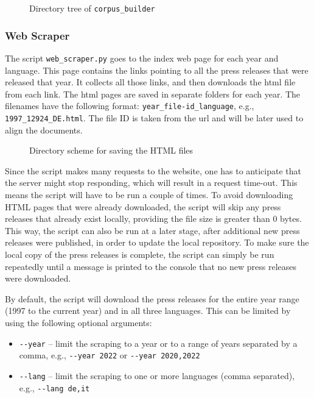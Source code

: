 \begin{figure}

\caption{Directory tree of \texttt{corpus\_builder}}
\end{figure} 
\subsubsection{Web Scraper}
\label{subsubsec:web-scraper}
The script \texttt{web\_scraper.py} goes to the index web page for each year and language. 
This page contains the links pointing to all the press releases that were released that year. 
It collects all those links, and then downloads the \acrshort{html} file from each link. 
The \acrshort{html} pages are saved in separate folders for each year. 
The filenames have the following format: \texttt{year\_file-id\_language}, e.g., \texttt{1997\_12924\_DE.html}. 
The file ID is taken from the \gls{url} and will be later used to align the documents. 


\begin{figure}[ht]
\caption{Directory scheme for saving the HTML files}
\label{fig:html-scheme}
\end{figure} 

Since the script makes many requests to the website, one has to anticipate that the server might stop responding, which will result in a request time-out.  This means the script will have to be run a couple of times.
To avoid downloading HTML pages that were already downloaded, the script will skip any press releases that already exist locally, providing the file size is greater than 0 bytes.
This way, the script can also be run at a later stage, after additional new press releases were published, in order to update the local repository.
To make sure the local copy of the press releases is complete, the script can simply be run repeatedly until a message is printed to the console that no new press releases were downloaded. 

By default, the script will download the press releases for the entire year range (1997 to the current year) and in all three languages. 
This can be limited by using the following optional arguments:
\begin{itemize}
	\item \texttt{-{}-year} -- limit the scraping to a year or to a range of years separated by a comma, e.g., \texttt{-{}-year 2022} or \texttt{-{}-year 2020,2022}
	\item \texttt{-{}-lang} -- limit the scraping to one or more languages (comma separated), e.g., \texttt{-{}-lang de,it}
\end{itemize}


